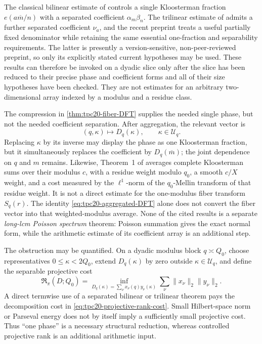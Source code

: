 The classical bilinear estimate of
\citet{DukeFriedlanderIwaniec1997} controls a single Kloosterman
fraction \(e(a\overline m/n)\) with a separated coefficient
\(\alpha_m\beta_n\).  The trilinear estimate of
\citet{BettinChandee2018} admits a further separated coefficient
\(\nu_a\), and the recent preprint \citet{Wright2026} treats a useful
partially fixed denominator while retaining the same essential
one-fraction and separability requirements.  The latter is presently a
version-sensitive, non-peer-reviewed preprint, so only its explicitly
stated current hypotheses may be used.  These results can therefore
be invoked on a dyadic slice only after the slice has been reduced to
their precise phase and coefficient forms and all of their size
hypotheses have been checked.  They are not estimates for an arbitrary
two-dimensional array indexed by a modulus and a residue class.

The compression in \cref{thm:tpc20-fiber-DFT} supplies the needed
single phase, but not the needed coefficient separation.  After
aggregation, the relevant vector is
\[
 (q,\kappa)\longmapsto D_q(\kappa),
 \qquad \kappa\in\mathcal U_q.
\]
Replacing \(\kappa\) by its inverse may display the phase as one
Kloosterman fraction, but it simultaneously replaces the coefficient
by \(D_q(\overline m)\); the joint dependence on \(q\) and \(m\)
remains.  Likewise, Theorem~1 of \citet{BlomerMilicevic2015} averages
complete Kloosterman sums over their modulus \(c\), with a residue weight
modulo \(q_0\), a smooth \(c/X\) weight, and a cost measured by
the \(\ell^1\)-norm of the \(q_0\)-Mellin transform of that residue
weight.  It is not a direct estimate for the one-modulus fiber transform
\(S_q(r)\).  The identity \eqref{eq:tpc20-aggregated-DFT} alone does not
convert the fiber vector into that weighted-modulus average.
None of the cited results is a separate \emph{long-lcm Poisson spectrum}
theorem: Poisson summation gives the exact normal form, while the
arithmetic estimate of its coefficient array is an additional step.

The obstruction may be quantified.  On a dyadic modulus block
\(q\asymp Q_0\), choose representatives \(0\leq\kappa<2Q_0\), extend
\(D_q(\kappa)\) by zero outside \(\kappa\in\mathcal U_q\), and define
the separable projective cost
\begin{equation}
 \mathfrak R_\pi(D;Q_0)
 =\inf_{D_q(\kappa)=\sum_\nu x_\nu(q)y_\nu(\kappa)}
   \sum_\nu\lVert x_\nu\rVert_2\lVert y_\nu\rVert_2.
 \label{eq:tpc20-projective-rank-cost}
\end{equation}
A direct termwise use of a separated bilinear or trilinear theorem pays
the decomposition cost in
\eqref{eq:tpc20-projective-rank-cost}.  Small Hilbert-space norm or
Parseval energy does not by itself imply a sufficiently small projective
cost.  Thus ``one phase'' is a necessary structural reduction, whereas
controlled projective rank is an additional arithmetic input.

